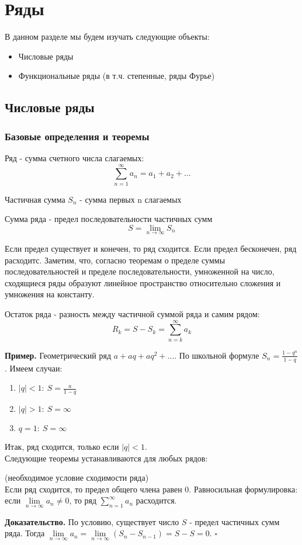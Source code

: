 \chapter{Ряды}
В данном разделе мы будем изучать следующие объекты:
\begin{itemize}
    \item Числовые ряды
    \item Функциональные ряды (в т.ч. степенные, ряды Фурье)
\end{itemize}

\section{Числовые ряды}
\subsection{Базовые определения и теоремы}
\begin{defin}
Ряд - сумма счетного числа слагаемых: $$\sum_{n=1}^{\infty} a_n =a_1+a_2+
\ldots$$
\end{defin}
\begin{defin}
Частичная сумма $S_n$ - сумма первых n слагаемых
\end{defin}
\begin{defin}
Сумма ряда - предел последовательности частичных сумм 
$$S=\lim\limits_{n \to \infty}S_n$$
\end{defin}
Если предел существует и конечен, то ряд сходится. Если предел бесконечен, ряд 
расходитс. Заметим, что, согласно теоремам о пределе суммы последовательностей
и пределе последовательности, умноженной на число, сходящиеся ряды образуют
линейное пространство относительно сложения и умножения на константу.
\begin{defin}
Остаток ряда - разность между частичной суммой ряда и самим рядом: 
$$R_k=S-S_k=\sum_{n=k}^{\infty} a_k$$
\end{defin}
\textbf{Пример.} Геометрический ряд $a+aq+aq^2+\ldots$. По школьной 
формуле $S_n=\frac{1-q^n}{1-q}$. Имеем случаи:
\begin{enumerate}
    \item $|q|<1:~S=\frac{a}{1-q}$ 
    \item $|q|>1:~S=\infty$
    \item $q=1:~S=\infty$
\end{enumerate}
Итак, ряд сходится, только если $|q|<1$.\\
Следующие теоремы устанавливаются для любых рядов:
\begin{theor}(необходимое условие сходимости ряда)\\
Если ряд сходится, то предел общего члена равен 0.
Равносильная формулировка: если
$\lim\limits_{n\to\infty} a_n\ne0$, то ряд $\sum\limits_{n=1}^{\infty} a_n $
расходится.
\end{theor}
\textbf{Доказательство.} По условию, существует число $S$ - предел частичных 
сумм ряда.
Тогда $\lim\limits_{n \to \infty}a_n=\lim\limits_{n \to \infty}(S_{n}-S_{n-1})
=S-S=0$. 
$\square$

